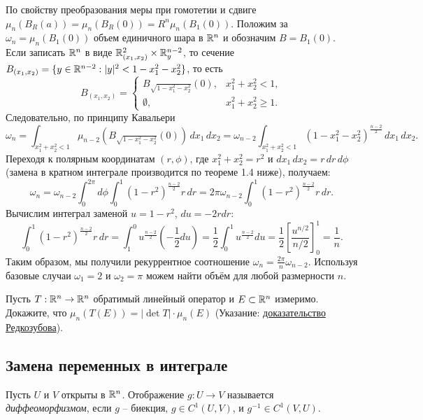 \begin{myproof}
    По свойству преобразования меры при гомотетии и сдвиге
    $\mu_n(B_R(a)) = \mu_n(B_R(0)) = R^n \mu_n(B_1(0))$. 
    Положим за $\omega_n = \mu_n(B_1(0))$ объем единичного шара в $\mathbb{R}^n$ и обозначим $B = B_1(0)$. 
    Если записать $\mathbb{R}^n$ в виде $\mathbb{R}^2_{(x_1, x_2)} \times \mathbb{R}^{n-2}_y$, то сечение $B_{(x_1, x_2)} = \{y \in \mathbb{R}^{n-2} : |y|^2 < 1 - x_1^2 - x_2^2\}$, то есть 
    \[ B_{(x_1, x_2)} = \begin{cases}
     B_{\sqrt{1 - x_1^2 - x_2^2}}(0), & x_1^2 + x_2^2 < 1,  \\  
     \emptyset, & x_1^2 +x_2^2 \geq 1. 
    \end{cases}\]
    Следовательно, по принципу Кавальери 
    \[ \omega_n = \int_{x_1^2 + x_2^2 < 1} \mu_{n-2} (B_{\sqrt{1-x_1^2-x_2^2}} (0)) \, dx_1 \, dx_2 = \omega_{n-2} \int_{x_1^2+x_2^2 < 1} (1 - x_1^2 - x_2^2)^{\frac{n-2}{2}} \, dx_1 \, dx_2. \] 
	Переходя к полярным координатам $(r, \phi)$, где $x_1^2+x_2^2 = r^2$ и $dx_1 \, dx_2 = r \, dr \, d\phi$ (замена в кратном интеграле производится по теореме 1.4 ниже), получаем:
    \[ \omega_n = \omega_{n-2} \int_0^{2\pi} d\phi \int_0^1 (1-r^2)^{\frac{n-2}{2}} r \, dr = 2\pi \omega_{n-2} \int_0^1 (1-r^2)^{\frac{n-2}{2}} r \, dr. \]
    Вычислим интеграл заменой $u = 1-r^2$, $du = -2rdr$:
    \[ \int_0^1 (1-r^2)^{\frac{n-2}{2}} r \, dr = \int_1^0 u^{\frac{n-2}{2}} \left(-\frac{1}{2} du\right) = \frac{1}{2} \int_0^1 u^{\frac{n-2}{2}} du = \frac{1}{2} \left[ \frac{u^{n/2}}{n/2} \right]_0^1 = \frac{1}{n}. \]
    Таким образом, мы получили рекуррентное соотношение $\omega_n = \frac{2\pi}{n} \omega_{n-2}$.
    Используя базовые случаи $\omega_1=2$ и $\omega_2=\pi$ можем найти объём для любой размерности $n$.
\end{myproof}


\begin{problem}
    Пусть $T : \mathbb{R}^n \to \mathbb{R}^n$ обратимый линейный оператор и $E \subset \mathbb{R}^n$ измеримо. 
    Докажите, что $\mu_n(T(E)) = |\det T| \cdot \mu_n(E)$ (Указание: \href{https://youtu.be/MrbVp30tSPc?list=PL4_hYwCyhAvaNULcW2kwdthjEfCDAMsRy&t=3172}{доказательство Редкозубова}).
\end{problem}

\subsection{Замена переменных в интеграле}

\begin{definition}
    Пусть $U$ и $V$ открыты в $\mathbb{R}^n$. Отображение $g : U \to V$ называется \textit{диффеоморфизмом}, если $g$ -- биекция, $g \in C^1(U, V)$, и $g^{-1} \in C^1(V, U)$.
\end{definition}

